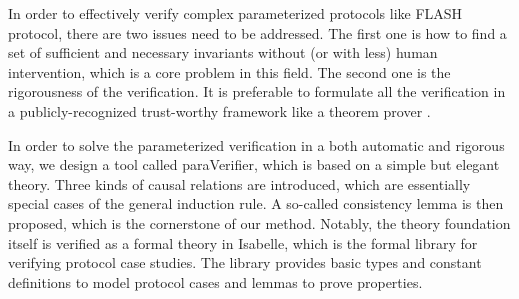 \documentclass[conference]{IEEEtran}
\newcommand\cai[1]{\textcolor{blue}{#1} }
\begin{document}
{%
In order to effectively verify complex parameterized protocols like FLASH protocol, there are two issues need to be addressed.
The first one is  how to find a set of sufficient and necessary invariants without (or with less) human intervention, which is a core problem in this field. %
The second one is the rigorousness  of the verification. %
It is preferable to formulate all the verification in a publicly-recognized trust-worthy framework like a theorem prover \cite{Chou2004}.


In order to solve the parameterized
verification %
 in a both automatic and rigorous way, we design a tool called {\sf paraVerifier}, which is based on a simple but elegant theory.  Three kinds of causal
relations are introduced, which are
essentially special cases of the general induction rule. A
so-called consistency lemma is then proposed, which is the cornerstone of
our method. Notably, the theory foundation itself is  verified as a
formal theory in Isabelle, which is the formal library for verifying protocol case studies. The library provides basic types and constant definitions to model protocol cases and lemmas to prove  properties. %

}
\end{document}
